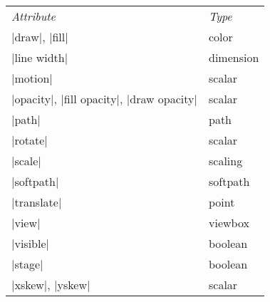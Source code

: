 \begin{command}{\pgfanimateattribute{}}
  \begin{tabular}{ll}
    \emph{Attribute} & \emph{Type} \\
    |draw|, |fill|              & color \\
    |line width|                & dimension \\
    |motion|                    & scalar \\
    |opacity|, |fill opacity|, |draw opacity|              & scalar \\
    |path|                      & path \\
    |rotate|                    & scalar \\
    |scale|                     & scaling \\
    |softpath|                  & softpath \\
    |translate|                 & point \\
    |view|                      & viewbox \\
    |visible|                   & boolean \\
    |stage|                     & boolean \\
    |xskew|, |yskew|            & scalar \\
  \end{tabular}


\end{command}
